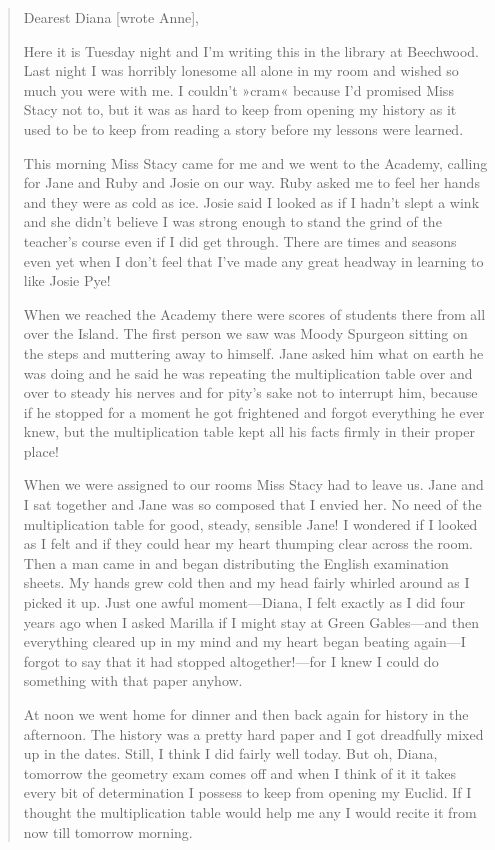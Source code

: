 \begin{quotation}
\noindent Dearest Diana [wrote Anne],

Here it is Tuesday night and I’m writing this in the library at Beechwood. Last night I was horribly lonesome all alone in my room and wished so much you were with me. I couldn’t »cram« because I’d promised Miss Stacy not to, but it was as hard to keep from opening my history as it used to be to keep from reading a story before my lessons were learned.

This morning Miss Stacy came for me and we went to the Academy, calling for Jane and Ruby and Josie on our way. Ruby asked me to feel her hands and they were as cold as ice. Josie said I looked as if I hadn’t slept a wink and she didn’t believe I was strong enough to stand the grind of the teacher’s course even if I did get through. There are times and seasons even yet when I don’t feel that I’ve made any great headway in learning to like Josie Pye!

When we reached the Academy there were scores of students there from all over the Island. The first person we saw was Moody Spurgeon sitting on the steps and muttering away to himself. Jane asked him what on earth he was doing and he said he was repeating the multiplication table over and over to steady his nerves and for pity’s sake not to interrupt him, because if he stopped for a moment he got frightened and forgot everything he ever knew, but the multiplication table kept all his facts firmly in their proper place!

When we were assigned to our rooms Miss Stacy had to leave us. Jane and I sat together and Jane was so composed that I envied her. No need of the multiplication table for good, steady, sensible Jane! I wondered if I looked as I felt and if they could hear my heart thumping clear across the room. Then a man came in and began distributing the English examination sheets. My hands grew cold then and my head fairly whirled around as I picked it up. Just one awful moment—Diana, I felt exactly as I did four years ago when I asked Marilla if I might stay at Green Gables—and then everything cleared up in my mind and my heart began beating again—I forgot to say that it had stopped altogether!—for I knew I could do something with that paper anyhow.

At noon we went home for dinner and then back again for history in the afternoon. The history was a pretty hard paper and I got dreadfully mixed up in the dates. Still, I think I did fairly well today. But oh, Diana, tomorrow the geometry exam comes off and when I think of it it takes every bit of determination I possess to keep from opening my Euclid. If I thought the multiplication table would help me any I would recite it from now till tomorrow morning.


\end{quotation}
